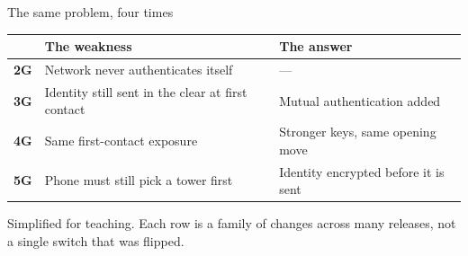 \begin{frame}{The same problem, four times}
  \vspace{0.4em}
  {\small
  \begin{tabular}{@{}p{}p{}p{}@{}}
    \toprule
    & \textbf{\textcolor{coreorange}{The weakness}} & \textbf{\textcolor{softgreen}{The answer}}\\
    \midrule
    \textbf{2G} & Network never authenticates itself & ---\\[3pt]
    \textbf{3G} & Identity still sent in the clear at first contact & Mutual authentication added\\[3pt]
    \textbf{4G} & Same first-contact exposure & Stronger keys, same opening move\\[3pt]
    \textbf{5G} & Phone must still pick a tower first & Identity encrypted before it is sent\\
    \bottomrule
  \end{tabular}\par}

  \vspace{0.8em}

  \vspace{0.3em}
  {\scriptsize\textcolor{softgray}{Simplified for teaching. Each row is a family of
   changes across many releases, not a single switch that was flipped.}\par}
\end{frame}

